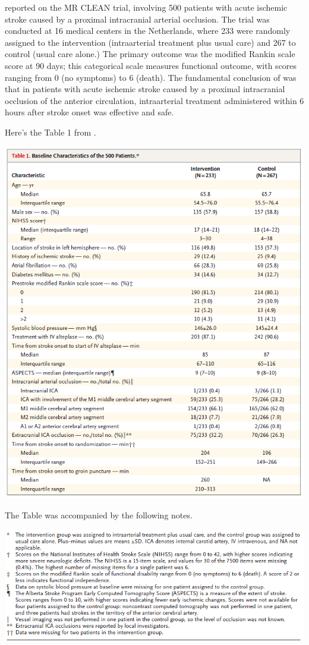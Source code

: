 \documentclass[]{book}
\theoremstyle{definition}
\theoremstyle{definition}
\theoremstyle{definition}
\theoremstyle{remark}
\begin{document}
\citet{Berkhemer2015} reported on the MR CLEAN trial, involving 500
patients with acute ischemic stroke caused by a proximal intracranial
arterial occlusion. The trial was conducted at 16 medical centers in the
Netherlands, where 233 were randomly assigned to the intervention
(intraarterial treatment plus usual care) and 267 to control (usual care
alone.) The primary outcome was the modified Rankin scale score at 90
days; this categorical scale measures functional outcome, with scores
ranging from 0 (no symptoms) to 6 (death). The fundamental conclusion of
\citet{Berkhemer2015} was that in patients with acute ischemic stroke
caused by a proximal intracranial occlusion of the anterior circulation,
intraarterial treatment administered within 6 hours after stroke onset
was effective and safe.

Here's the Table 1 from \citet{Berkhemer2015}.

\includegraphics[width=0.9\linewidth]{images/Berkhemer-snip4complete}

The Table was accompanied by the following notes.

\includegraphics[width=0.9\linewidth]{images/Berkhemer-snip4notes}
\end{document}
